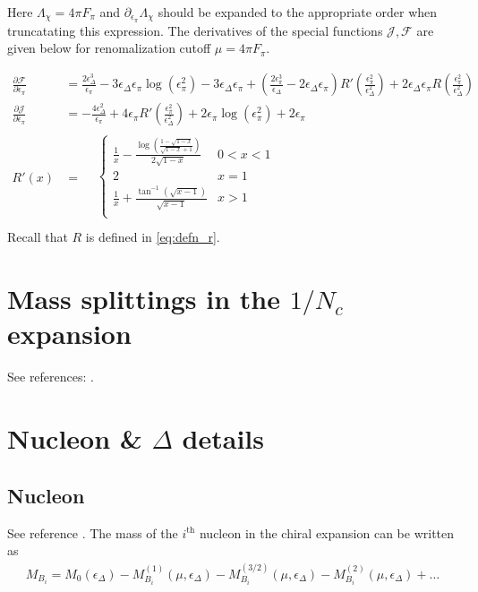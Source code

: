 \documentclass[12pt,tightenlines, raggedbottom, prd, notitlepage]{revtex4-1}
\begin{document}
Here $\Lambda_\chi = 4 \pi F_\pi$ and $\partial_{\epsilon_\pi}\Lambda_\chi$ should be expanded to the appropriate order when truncatating this expression. The derivatives of the special functions $\mathcal J, \mathcal F$ are given below for renomalization cutoff $\mu = 4\pi F_\pi$.

\begin{align}
\frac{\partial \mathcal F}{\partial \epsilon_\pi}
& = \frac{2 \epsilon_\Delta ^3}{\epsilon_\pi }
-3 \epsilon_\Delta  \epsilon_\pi  \log \left(\epsilon_\pi ^2\right)
-3 \epsilon_\Delta  \epsilon_\pi +\left(\frac{2 \epsilon_\pi ^3}{\epsilon_\Delta }
-2 \epsilon_\Delta  \epsilon_\pi \right) R'\left(\frac{\epsilon_\pi ^2}{\epsilon_\Delta ^2}\right)
+2 \epsilon_\Delta  \epsilon_\pi  R\left(\frac{\epsilon_\pi ^2}{\epsilon_\Delta ^2}\right)
\\
\frac{\partial \mathcal J}{\partial \epsilon_\pi}
&= -\frac{4 \epsilon_\Delta ^2}{\epsilon_\pi }+4 \epsilon_\pi  R'\left(\frac{\epsilon_\pi ^2}{\epsilon_\Delta ^2}\right)+2 \epsilon_\pi  \log \left(\epsilon_\pi ^2\right)+2 \epsilon_\pi
\\
R'(x) &=\begin{array}{cc}
    &  
    \left\{ \begin{array}{cc}
    \frac{1}{x}-\frac{\log \left(\frac{1-\sqrt{1-x}}{\sqrt{1-x}+1}\right)}{2 \sqrt{1-x}} & 0<x<1 \\
    2 & x=1 \\
    \frac{1}{x}+\frac{\tan ^{-1}\left(\sqrt{x-1}\right)}{\sqrt{x-1}} & x>1 \\
   \end{array} \right.
    \\ 
   \end{array}
\end{align}
Recall that $R$ is defined in \eqref{eq:defn_r}.


\section{Mass splittings in the $1/N_c$ expansion}
See references: \cite{Dashen:1993jt, Jenkins:1995td}.





\appendix

\section{Nucleon \& $\Delta$ details}
\subsection{Nucleon}
See reference \cite{Tiburzki:2006}. The mass of the $i^\text{th}$ nucleon in the chiral expansion can be written as
\begin{align*}
M_{B_i} = M_0 \left(\epsilon_\Delta \right) - 
M_{B_i}^{(1)}\left(\mu, \epsilon_\Delta \right)
- M_{B_i}^{(3/2)}\left(\mu, \epsilon_\Delta \right)
- M_{B_i}^{(2)}\left(\mu, \epsilon_\Delta \right) + \dots
\end{align*}
\end{document}
